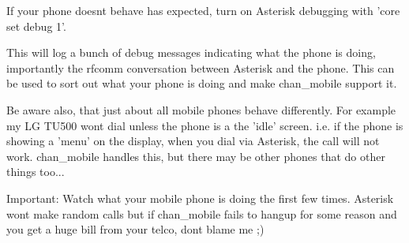 If your phone doesnt behave has expected, turn on Asterisk debugging with 'core set debug 1'.

This will log a bunch of debug messages indicating what the phone is doing, importantly the rfcomm
conversation between Asterisk and the phone. This can be used to sort out what your phone is doing
and make chan\_mobile support it.

Be aware also, that just about all mobile phones behave differently. For example my LG TU500 wont dial unless
the phone is a the 'idle' screen. i.e. if the phone is showing a 'menu' on the display, when you dial via
Asterisk, the call will not work. chan\_mobile handles this, but there may be other phones that do
other things too...

Important: Watch what your mobile phone is doing the first few times. Asterisk wont make random calls but
if chan\_mobile fails to hangup for some reason and you get a huge bill from your telco, dont blame me ;)

